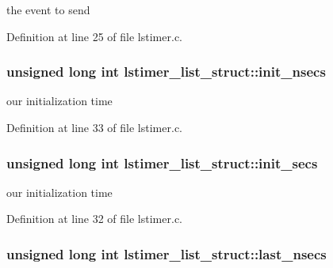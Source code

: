 the event to send 



Definition at line 25 of file lstimer.\-c.

\hypertarget{structlstimer__list__struct_ad5bb7fa7d669b7ebbe34d8ed2bdb257a}{
\subsubsection[{init\-\_\-nsecs}]{\setlength{\rightskip}{0pt plus 5cm}unsigned long int lstimer\-\_\-list\-\_\-struct\-::init\-\_\-nsecs}}\label{structlstimer__list__struct_ad5bb7fa7d669b7ebbe34d8ed2bdb257a}


our initialization time 



Definition at line 33 of file lstimer.\-c.

\hypertarget{structlstimer__list__struct_a1222c76d49b149725467aa698abb7fb1}{
\subsubsection[{init\-\_\-secs}]{\setlength{\rightskip}{0pt plus 5cm}unsigned long int lstimer\-\_\-list\-\_\-struct\-::init\-\_\-secs}}\label{structlstimer__list__struct_a1222c76d49b149725467aa698abb7fb1}


our initialization time 



Definition at line 32 of file lstimer.\-c.

\hypertarget{structlstimer__list__struct_a19acf5aa7f57aa7ce60537c3d3d6a6af}{
\subsubsection[{last\-\_\-nsecs}]{\setlength{\rightskip}{0pt plus 5cm}unsigned long int lstimer\-\_\-list\-\_\-struct\-::last\-\_\-nsecs}}\label{structlstimer__list__struct_a19acf5aa7f57aa7ce60537c3d3d6a6af}


